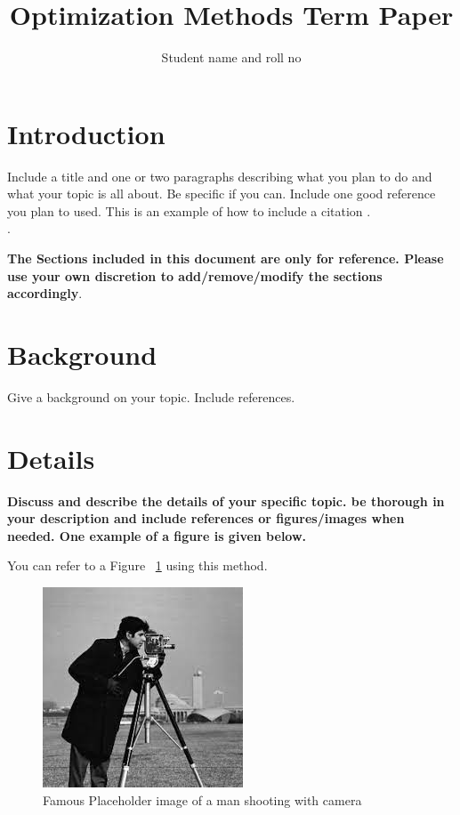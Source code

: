 \documentclass[journal]{IEEEtran}
\begin{document}
\title{Optimization Methods Term Paper}

\author{Student name and roll no}%
        

\maketitle


\section{Introduction }
Include a title and one or two paragraphs describing what you plan to do and what your topic is all about. Be specific if you can. Include  one good reference you plan to used. This is an example of how to include a citation \cite{williams1989style}.  \\.

\textbf{The Sections included in this document are only for reference. Please use your own discretion to add/remove/modify the sections accordingly}.

\section {Background}
Give a background on your topic. Include references.

\blindtext
\blindtext
\blindtext

\section{Details}
\textbf{Discuss and describe the details of your specific topic. be thorough in your description and include references or figures/images when needed. One example of a figure is given below.}

You can refer to a Figure ~\ref{fig:man_with_camera} using this method.

\begin{figure}%
\centering
\includegraphics[width=.6\linewidth]{Figures/Figure_1}
\caption{Famous Placeholder image of a man shooting with camera}
\label{fig:man_with_camera}
\end{figure}
\end{document}
